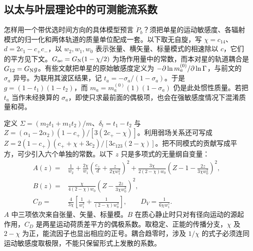 \subsection{以太与叶层理论中的可测能流系数}

怎样用一个带优选时间方向的具体模型预言 $\dot P_b$？须把单星的运动敏感度、各辐射模式的归一化和两体轨道的质量单位配成一套。以下取无自旋，写 $\chi=c_{14}$、$d=2c_1-c_+c_-$，以 $w_2,w_1,w_0$ 表示张量、横矢量、标量模式的相速除以 $c$，它们的平方见下文。$G_{\rm ae}=G_{\rm N}(1-\chi/2)$ 为场作用量中的常数，而本对星的轨道耦合是 $G_{12}=G_{\rm N}g$。有些文献把单星的原始敏感度定义为 $-\partial\ln m_a^{(0)}/\partial\ln\Gamma$，与前文的 $\sigma_a$ 异号。为联用其波区结果，记 $t_a=-\sigma_a/(1-\sigma_a)$。于是 $g=(1-t_1)(1-t_2)$，而 $m_a=m_a^{(0)}(1)(1-\sigma_a)$ 仍是此处惯性质量。若把 $t_a$ 当作未经换算的 $\sigma_a$，即使只求最前面的偶极项，也会在强敏感度情况下混淆质量和荷。

定义 $\Sigma=(m_2t_1+m_1t_2)/m$、$\delta_t=t_1-t_2$ 与 $Z=(\alpha_1-2\alpha_2)(1-c_+)/[3(2c_+-\chi)]$。利用弱场关系还可写成 $Z=2(1-c_+)(c_++\chi+3c_2)/[3c_{123}(2-\chi)]$。把不同模式的贡献写成平方，可少引入六个单独的常数。以下 $z$ 只是多项式的无量纲自变量：
\begin{align*}
 A(z)={}&\frac1{w_2}
  +\frac{2\chi}{w_1}\left(\frac{c_+}{d}
                  +\frac{z}{2\chi w_1^2}\right)^2
  +\frac{3\chi}{2(2-\chi)w_0}
       \left(Z-1-\frac{2z}{3\chi w_0^2}\right)^2,\\
 B(z)={}&\frac{\chi}{4(2-\chi)w_0}
       \left(Z-\frac{2z}{3\chi w_0^2}\right)^2,\\
 C_D={}&\frac{4}{3\chi}
       \left[\frac1{w_1^3}+\frac{1}{(2-\chi)w_0^3}\right],
 \qquad D_V=\frac{1}{6\chi w_1^5}.
\end{align*}
$A$ 中三项依次来自张量、矢量、标量模。$B$ 在质心静止时只对有径向运动的源起作用，$C_D$ 是两星运动荷质差平方的偶极系数。取稳定、正能的传播分支，$\chi$ 及 $2-\chi$ 为正，能流因子也显出相应的正号。耦合趋零时，涉及 $1/\chi$ 的式子必须连同运动敏感度取极限，不能只保留形式上发散的系数。

